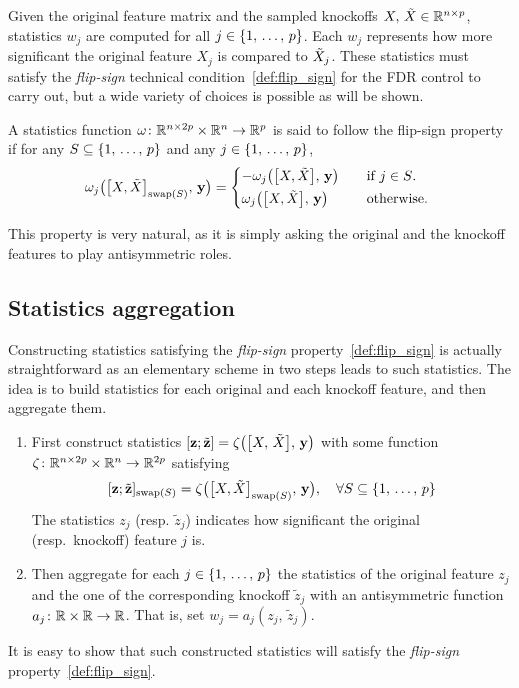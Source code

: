 Given the original feature matrix and the sampled knockoffs $X,\, \tilde{X} \in \mathbb{R}^{n \times p}$,
statistics $w_j$ are computed for all $j \in \left\{ 1,\, \dots,\, p \right\}$.
Each $w_j$ represents how more significant the original feature $X_j$ is compared to $\tilde{X}_j$.
These statistics must satisfy the \emph{flip-sign} technical condition~\ref{def:flip_sign}
for the FDR control to carry out,
but a wide variety of choices is possible as will be shown.
\begin{definition}\label{def:flip_sign}
A statistics function $\omega \colon \mathbb{R}^{n \times 2p} \times \mathbb{R}^n \to \mathbb{R}^p$
is said to follow the flip-sign property if for any $S \subseteq \left\{ 1,\, \dots,\, p \right\}$ and any $j \in \left\{ 1,\, \dots,\, p \right\}$,
\begin{equation*}
    \omega_j\big( \big[ X, \tX \big]_{\swap(S)},\, \yy \big) = \begin{cases*}
        -\omega_j\big( \big[ X, \tX \big],\, \yy \big) &\quad\text{if $j \in S$.}\\
        \omega_j\big( \big[ X, \tX \big],\, \yy \big) &\quad\text{otherwise.}
    \end{cases*}
\end{equation*}
\end{definition}
This property is very natural,
as it is simply asking the original and the knockoff features to play antisymmetric roles.

\subsection{Statistics aggregation}\label{subsec:ksa}

Constructing statistics satisfying the \emph{flip-sign} property~\ref{def:flip_sign} is actually straightforward
as an elementary scheme in two steps leads to such statistics.
The idea is to build statistics for each original and each knockoff feature, and then aggregate them.
\begin{enumerate}
    \item First construct statistics $[ \mathbf{z}; \tilde{\mathbf{z}} ] = \zeta\big( \big[ X,\, \tilde{X} \big],\, \mathbf{y} \big)$
        with some function $\zeta \colon \mathbb{R}^{n \times 2p} \times \mathbb{R}^n \to \mathbb{R}^{2p}$ satisfying
        \begin{equation}\label{eq:swap_cond}
        [ \mathbf{z}; \tilde{\mathbf{z}} ]_{\operatorname{swap}(S)} = \zeta\big( \big[ X, \tilde{X} \big]_{\operatorname{swap}(S)},\, \mathbf{y} \big)
        ,\quad
        \forall S \subseteq \left\{ 1,\, \dots,\, p \right\}
        \end{equation}
        The statistics $z_j$ (resp. $\tilde{z}_j$) indicates how significant the original (resp.\ knockoff) feature $j$ is.
    \item Then aggregate for each $j \in \left\{ 1,\, \dots,\, p \right\}$ the statistics of the original feature $z_j$ and the one of the corresponding
        knockoff $\tilde{z}_j$ with an antisymmetric function $a_j \colon \mathbb{R}\times\mathbb{R} \to \mathbb{R}$.
        That is, set $w_j = a_j(z_j,\, \tilde{z}_j)$.
\end{enumerate}
It is easy to show that such constructed statistics will satisfy the \emph{flip-sign} property~\ref{def:flip_sign}.

